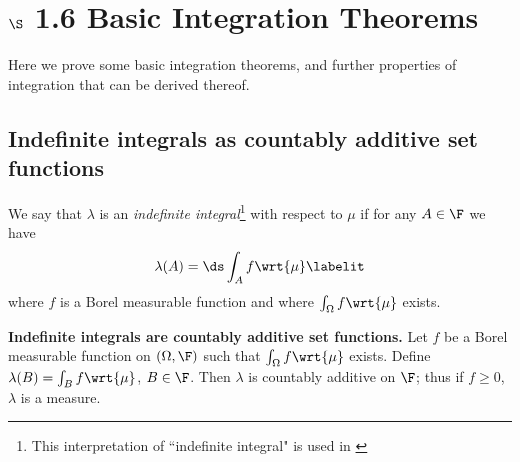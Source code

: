 \documentclass{article} %
\newcommand{\dmu}{\wrt{\mu}}
\begin{document}
 
\section{$\S$ 1.6 Basic Integration Theorems}

Here we prove some basic integration theorems, and further properties of integration that can be derived thereof.  %

\subsection{Indefinite integrals as countably additive set functions}

\begin{definition}
We say that $\lambda$ is an \textit{indefinite integral}\footnote{This interpretation of ``indefinite integral" is used in \cite[pp.~61]{ash2000probability}}  with respect to $\mu$ if for any $A \in \F$ we have
%
\begin{align*}
\lambda(A)  =  \ds\int_A f \dmu
\labelit \label{eqn:indefinite_integral}
\end{align*}
where $f$ is a Borel measurable function and where $\int_\Omega f \dmu$ exists.
\label{def:indefinite_integrals}	
\end{definition}

\begin{theorem}{\textbf{Indefinite integrals are countably additive set functions.}}
Let $f$ be a Borel measurable function on $(\Omega, \F)$ such that $\int_\Omega f \wrt{\mu}$ exists.  Define $\lambda(B) = \int_B f \wrt{\mu}$, $B \in \F$.  Then $\lambda$ is countably additive on $\F$; thus if $f \geq 0$, $\lambda$ is a measure.	
\label{thm:integrals_are_countably_additive_set_functions}
\end{theorem}
\end{document}
